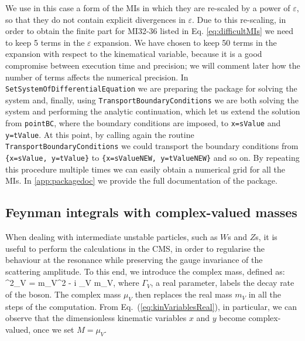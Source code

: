 \documentclass[final,1p,times]{elsarticle}
\begin{document}
We use in this case a form of the MIs in which they are re-scaled by a power of $\varepsilon$, so that they do not contain explicit divergences in $\varepsilon$. 
Due to this re-scaling, in order to obtain the finite part for MI32-36 listed in Eq. \ref{eq:difficultMIs} we need to keep 5 terms in the $\varepsilon$ expansion.
We have chosen to keep 50
terms in the expansion with respect to the kinematical variable, because it is a good compromise between execution time and precision; we will comment later 
how the number of terms affects the numerical precision. In \texttt{SetSystemOfDifferentialEquation} 
we are preparing the package for solving the system and, finally, using \texttt{Transport\-Boundary\-Conditions}
we are both solving the system and performing the analytic continuation, which let
us extend the solution from \texttt{pointBC}, where the boundary conditions are imposed, to \texttt{x=sValue} and 
\texttt{y=tValue}. At this point, by calling again the routine \texttt{Transport\-Boundary\-Conditions} we could transport the boundary conditions from \texttt{\{x=sValue, y=tValue\}} to 
\texttt{\{x=sValueNEW, y=tValueNEW\}} and so on. By repeating this procedure multiple times we can easily obtain a numerical grid for all the MIs. In \ref{app:packagedoc} we provide the full documentation of the package.

\subsection{Feynman integrals with complex-valued masses}

When dealing with intermediate unstable particles, such as $W$s and $Z$s, it is useful to perform the calculations in the CMS, in order to regularise the behaviour at the resonance while preserving the gauge invariance of the scattering amplitude.
To this end, we introduce the complex mass, defined as:
\be 
\label{eq:complex_mass}
\mu^2_V = m_V^2 - i \Gamma_V m_V,
\ee
where $\Gamma_V$, a real parameter, labels the decay rate of the boson.
The complex mass $\mu_V$ then replaces the real mass $m_V$ in all the steps of the computation.
From Eq.~(\ref{eq:kinVariablesReal}), in particular, we can observe that the
dimensionless kinematic variables $x$ and $y$ become complex-valued, once we set $M=\mu_V$.
\end{document}
